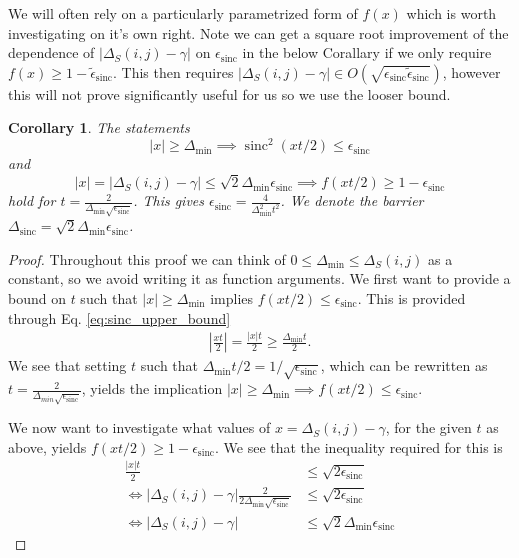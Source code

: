 \documentclass{article}
\newtheorem{corollary}[theorem]{Corollary}
\newcommand{\parens}[1]{\left( #1 \right)}
\newcommand{\abs}[1]{\left| #1 \right|}
\newcommand{\bigo}[1]{O\left( #1 \right)}
\DeclareMathOperator{\sinc}{sinc}
\begin{document}
We will often rely on a particularly parametrized form of $f(x)$ which is worth investigating on it's own right. Note we can get a square root improvement of the dependence of $|\Delta_S(i,j) - \gamma|$ on $\epsilon_{\sinc}$ in the below Corallary if we only require $f(x) \geq 1 - \widetilde{\epsilon}_{\sinc}$. This then requires $|\Delta_S(i,j) - \gamma| \in \bigo{\sqrt{\epsilon_{\sinc} \widetilde{\epsilon}_{\sinc}}}$, however this will not prove significantly useful for us so we use the looser bound.
\begin{corollary} \label{cor:gamma_difference_reqs}
    The statements 
    $$|x| \geq \Delta_{\min} \implies \sinc^2\parens{xt / 2} \leq \epsilon_{\sinc}$$
    and
    $$|x| = |\Delta_S(i,j) - \gamma| \leq \sqrt{2} \Delta_{\min} \epsilon_{\sinc} \implies f(xt/2) \geq 1 - \epsilon_{\sinc}$$
    hold for $t = \frac{2}{\Delta_{\min} \sqrt{\epsilon_{\sinc}}}$. This gives $\epsilon_{\sinc} = \frac{4}{\Delta_{\min}^2 t^2}$. We denote the barrier $\Delta_{\sinc} = \sqrt{2} \Delta_{\min} \epsilon_{\sinc}$. 
\end{corollary}
\begin{proof}
    Throughout this proof we can think of $0 \leq \Delta_{\min} \leq \Delta_S(i,j)$ as a constant, so we avoid writing it as function arguments.
    We first want to provide a bound on $t$ such that $|x| \geq \Delta_{\min}$ implies $f(xt/2) \leq \epsilon_{\sinc}$. This is provided through Eq. \eqref{eq:sinc_upper_bound}
    \begin{align}
        \left| \frac{x t }{ 2} \right| = \frac{|x| t}{2} \geq \frac{\Delta_{\min}t}{2}.
    \end{align}
    We see that setting $t$ such that $\Delta_{\min} t / 2 = 1 /\sqrt{\epsilon_{\sinc}}$, which can be rewritten as $t = \frac{2}{\Delta_{min} \sqrt{\epsilon_{\sinc}}}$, yields the implication $|x| \geq \Delta_{\min} \implies f(xt/2) \leq \epsilon_{\sinc}$. 

    We now want to investigate what values of $x = \Delta_S(i,j) - \gamma$, for the given $t$ as above, yields $f(xt/2) \geq 1 - \epsilon_{\sinc}$. We see that the inequality required for this is
    \begin{align}
        \frac{|x| t}{2} &\leq \sqrt{2 \epsilon_{\sinc}} \\
        \iff  |\Delta_S(i,j) - \gamma| \frac{2}{2 \Delta_{\min} \sqrt{\epsilon_{\sinc}}} &\leq \sqrt{2 \epsilon_{\sinc}} \\
        \iff \abs{\Delta_S(i,j) - \gamma} &\leq \sqrt{2} \Delta_{\min} \epsilon_{\sinc}
    \end{align}
\end{proof}
\end{document}

